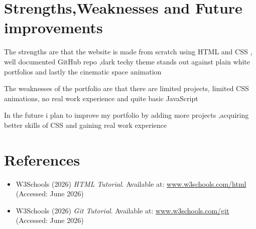 \documentclass{article}
\begin{document}
\section{Strengths,Weaknesses and Future improvements}

The strengths are that the website is made from scratch using HTML and CSS , well documented GitHub repo ,dark techy theme stands out against plain white portfolios and lastly the cinematic space animation

The weaknesses of the portfolio are that there are limited projects, limited CSS animations, no real work experience and quite basic JavaScript

In the future i plan to improve my portfolio by adding more projects ,acquiring better skills of CSS and gaining real work experience 

\section{References}
\begin{itemize}
    \item W3Schools (2026) \textit{HTML Tutorial}. Available at: \href{https://www.w3schools.com/html}{www.w3schools.com/html} (Accessed: June 2026)
    \item W3Schools (2026) \textit{Git Tutorial}. Available at: \href{https://www.w3schools.com/git}{www.w3schools.com/git} (Accessed: June 2026)
\end{itemize}
\end{document}
